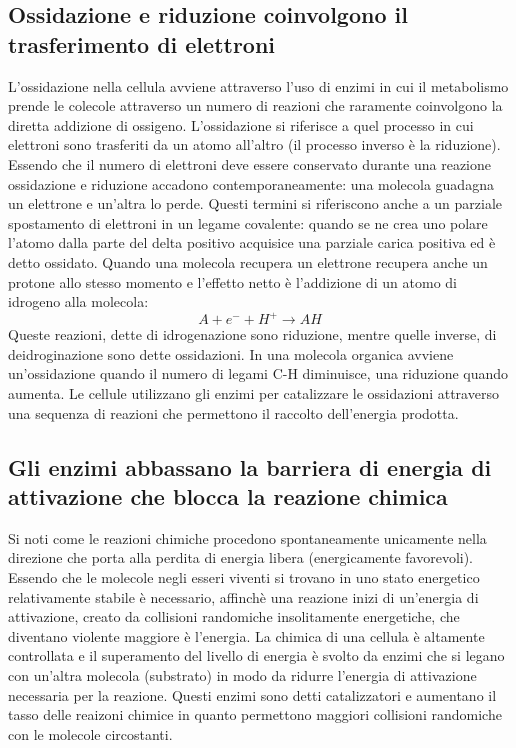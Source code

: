 \subsection{Ossidazione e riduzione coinvolgono il trasferimento di elettroni}
L'ossidazione nella cellula avviene attraverso l'uso di enzimi in cui il metabolismo prende le colecole attraverso un numero di reazioni che raramente coinvolgono la diretta addizione 
di ossigeno. L'ossidazione si riferisce a quel processo in cui elettroni sono trasferiti da un atomo all'altro (il processo inverso \`e la riduzione). Essendo che il numero di elettroni
deve essere conservato durante una reazione ossidazione e riduzione accadono contemporaneamente: una molecola guadagna un elettrone e un'altra lo perde. Questi termini si riferiscono
anche a un parziale spostamento di elettroni in un legame covalente: quando se ne crea uno polare l'atomo dalla parte del delta positivo acquisice una parziale carica positiva ed \`e
detto ossidato. Quando una molecola recupera un elettrone recupera anche un protone allo stesso momento e l'effetto netto \`e l'addizione di un atomo di idrogeno alla molecola:
$$ A+e^-+H^+\rightarrow AH$$
Queste reazioni, dette di idrogenazione sono riduzione, mentre quelle inverse, di deidroginazione sono dette ossidazioni. In una molecola organica avviene un'ossidazione quando il numero
di legami C-H diminuisce, una riduzione quando aumenta. Le cellule utilizzano gli enzimi per catalizzare le ossidazioni attraverso una sequenza di reazioni che permettono il raccolto
dell'energia prodotta. 
\subsection{Gli enzimi abbassano la barriera di energia di attivazione che blocca la reazione chimica}
Si noti come le reazioni chimiche procedono spontaneamente unicamente nella direzione che porta alla perdita di energia libera (energicamente favorevoli). Essendo che le molecole negli
esseri viventi si trovano in uno stato energetico relativamente stabile \`e necessario, affinch\`e una reazione inizi di un'energia di attivazione, creato da collisioni randomiche 
insolitamente energetiche, che diventano violente maggiore \`e l'energia. La chimica di una cellula \`e altamente controllata e il superamento del livello di energia \`e svolto da 
enzimi che si legano con un'altra molecola (substrato) in modo da ridurre l'energia di attivazione necessaria per la reazione. Questi enzimi sono detti catalizzatori e aumentano il 
tasso delle reaizoni chimice in quanto permettono maggiori collisioni randomiche con le molecole circostanti. 

